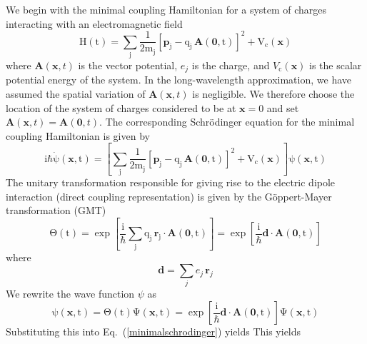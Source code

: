 \documentclass[twocolumn,english,pra,aps,superscriptaddress,floatfix]{revtex4-1}
\begin{document}
We begin with the minimal coupling Hamiltonian for a system of charges interacting with an electromagnetic field
\begin{equation}
\mathrm{H(t)=\sum_{j}\frac{1}{2m_j}\left[\mathbf{p}_j-q_j \,\mathbf{A}(\mathbf{0},t)\right]^2+V_{c}(\mathbf{x})}
\label{appendixminimalhamiltonian}
\end{equation}
where $\mathbf{A}(\mathbf{x},t)$ is the vector potential, $e_j$ is the charge, and $V_{\mathrm{c}}(\mathbf{x})$ is the scalar potential energy of the system.  In the long-wavelength approximation, we have assumed the spatial variation of $\mathbf{A}(\mathbf{x},t)$ is negligible.  We therefore choose the location of the system of charges considered to be at $\mathbf{x}=0$ and set $\mathbf{A}(\mathbf{x},t)=\mathbf{A}(\mathbf{0},t)$.  The corresponding Schr\"{o}dinger equation for the minimal coupling Hamiltonian is given by
\begin{equation}
\mathrm{i\hbar \dot{\psi}(\mathbf{x},t)=\left[\sum_{j}\frac{1}{2m_j}\left[\mathbf{p}_j-q_j\, \mathbf{A}(\mathbf{0},t)\right]^2+V_{c}(\mathbf{x})\right]\psi(\mathbf{x},t)}
\label{minimalschrodinger}
\end{equation}
The unitary transformation responsible for giving rise to the electric dipole interaction (direct coupling representation) is given by the G\"{o}ppert-Mayer transformation (GMT)
\begin{equation}
\mathrm{\Theta (t)=\mathrm{\exp{\left[\frac{\mathrm{i}}{\mathrm{\hbar}}\sum_jq_j\,\mathbf{r}_j\cdot \mathbf{A}(\mathbf{0},t) \right]}=\exp{\left[\frac{\mathrm{i}}{\mathrm{\hbar}}\mathbf{d}\cdot \mathbf{A}(\mathbf{0},t) \right]}}}
\label{gmtransformation}
\end{equation}
where
\begin{equation}
\mathbf{d}=\sum_{j} e_j \,\mathbf{r}_j
\end{equation}
 We rewrite the wave function $\psi$ as
\begin{equation}
\mathrm{\psi(\mathbf{x},t)=\Theta(t)\Psi(\mathbf{x},t)=\exp{\left[\frac{\mathrm{i}}{\mathrm{\hbar}}\mathbf{d}\cdot \mathbf{A}(\mathbf{0},t) \right]}\Psi(\mathbf{x},t)}
\end{equation} 
Substituting this into Eq.\ (\ref{minimalschrodinger}) yields
This yields
\end{document}
